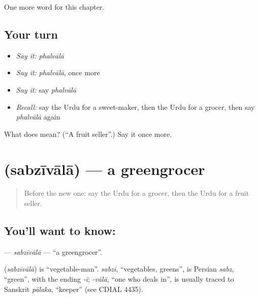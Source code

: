 \begin{grammarlens}[title={What you've built}]
One more word for this chapter.
\end{grammarlens}

\subsection*{Your turn}
\begin{itemize}
\raggedright
  \item \emph{Say it:} \emph{phalvālā}
  \item \emph{Say it:} \emph{phalvālā}, once more
  \item \emph{Say it:} say \emph{phalvālā}
  \item \emph{Recall:} say the Urdu for a sweet-maker, then the Urdu for a grocer, then say \emph{phalvālā} again
\end{itemize}

\begin{tcolorbox}[breakable,colback=teal!4,colframe=teal!35!black,title={Before you move on}]
What does   mean? (\textquotedblleft{}A fruit seller\textquotedblright{}.) Say it once more.
\end{tcolorbox}
\section[\texorpdfstring{\ur{سبزی} \ur{والا} (sabzīvālā)}{سبزی والا (sabzīvālā)}]{  (sabzīvālā) — a greengrocer}

\label{lesson:UR-C263-sabzivala}



\begin{quote}
Before the new one: say the Urdu for a grocer, then the Urdu for a fruit seller.
\end{quote}

\subsection*{You'll want to know:  }
\textbf{ } — \emph{sabzīvālā} — \textquotedblleft{}a greengrocer\textquotedblright{}.

\begin{cousinweb}
\textbf{ } (\emph{sabzīvālā}) is \textquotedblleft{}vegetable-man\textquotedblright{}. \emph{sabzī}, \textquotedblleft{}vegetables, greens\textquotedblright{}, is Persian \emph{sabz}, \textquotedblleft{}green\textquotedblright{}, with the ending \emph{-ī}; \emph{-vālā}, \textquotedblleft{}one who deals in\textquotedblright{}, is usually traced to Sanskrit \emph{pālaka}, \textquotedblleft{}keeper\textquotedblright{} (see CDIAL 4435).
\end{cousinweb}

